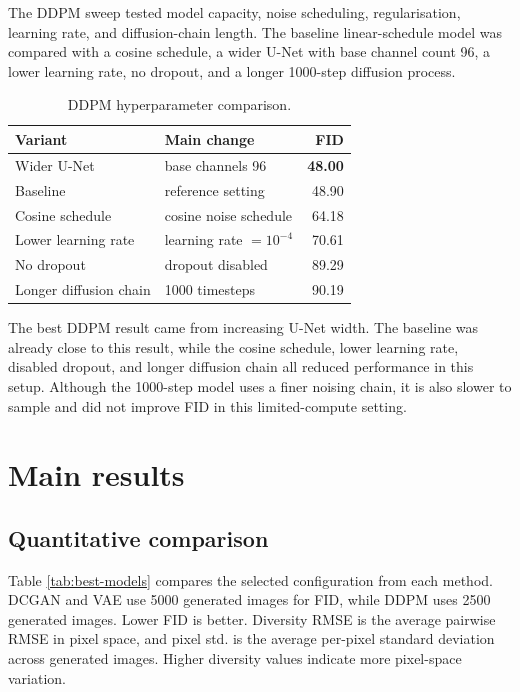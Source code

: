 \documentclass[11pt,a4paper]{article}
\begin{document}
The DDPM sweep tested model capacity, noise scheduling, regularisation, learning rate, and diffusion-chain length.
The baseline linear-schedule model was compared with a cosine schedule, a wider U-Net with base channel count 96, a lower learning rate, no dropout, and a longer 1000-step diffusion process.
\begin{table}[H]
\centering
\caption{DDPM hyperparameter comparison.}
\label{tab:ddpm-hparam}
\begin{tabular}{llr}
\toprule
Variant & Main change & FID \\
\midrule
Wider U-Net & base channels 96 & \textbf{48.00} \\
Baseline & reference setting & 48.90 \\
Cosine schedule & cosine noise schedule & 64.18 \\
Lower learning rate & learning rate $=10^{-4}$ & 70.61 \\
No dropout & dropout disabled & 89.29 \\
Longer diffusion chain & 1000 timesteps & 90.19 \\
\bottomrule
\end{tabular}
\end{table}

The best DDPM result came from increasing U-Net width. The baseline was already close to this result, while the cosine schedule, lower learning rate, disabled dropout, and longer diffusion chain all reduced performance in this setup. Although the 1000-step model uses a finer noising chain, it is also slower to sample and did not improve FID in this limited-compute setting.


\section{Main results}

\subsection{Quantitative comparison}

Table \ref{tab:best-models} compares the selected configuration from each method. DCGAN and VAE use 5000 generated images for FID, while DDPM uses 2500 generated images. Lower FID is better. Diversity RMSE is the average pairwise RMSE in pixel space, and pixel std. is the average per-pixel standard deviation across generated images. Higher diversity values indicate more pixel-space variation.
\end{document}
